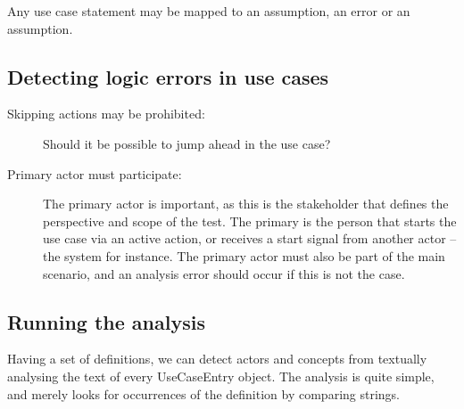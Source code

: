 Any use case statement may be mapped to an assumption, an error or an assumption.

\subsection{Detecting logic errors in use cases}

\begin{description}
  \item[Skipping actions may be prohibited:] Should it be possible to jump ahead in the use case?
  \item[Primary actor must participate:] The primary actor is important, as this is the stakeholder that defines the perspective and scope of the test. The primary is the person that starts the use case via an active action, or receives a start signal from another actor -- the system for instance. The primary actor must also be part of the main scenario, and an analysis error should occur if this is not the case.

\end{description}







\subsection{Running the analysis}
Having a set of definitions, we can detect actors and concepts from textually analysing the text of every UseCaseEntry object. The analysis is quite simple, and merely looks for occurrences of the definition by comparing strings.


